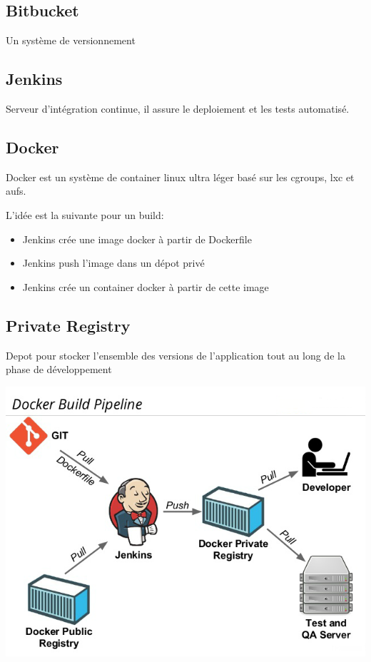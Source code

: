 \documentclass [a4paper,11pt]{article}
\begin{document}
\subsection{Bitbucket}

Un système de versionnement

\subsection{Jenkins}

Serveur d'intégration continue, il assure le deploiement et les tests automatisé.

\subsection{Docker}

Docker est un système de container linux ultra léger basé sur les cgroups, lxc et aufs.\newline

L'idée est la suivante pour un build:

\begin{itemize}
 \item Jenkins crée une image docker à partir de Dockerfile
 \item Jenkins push l'image dans un dépot privé
 \item Jenkins crée un container docker à partir de cette image
\end{itemize}

\subsection{Private Registry}

Depot pour stocker l'ensemble des versions de l'application tout au long de la phase de développement

\begin{center}
\includegraphics[scale=0.4]{img/registry.png}
\end{center}
\end{document}
